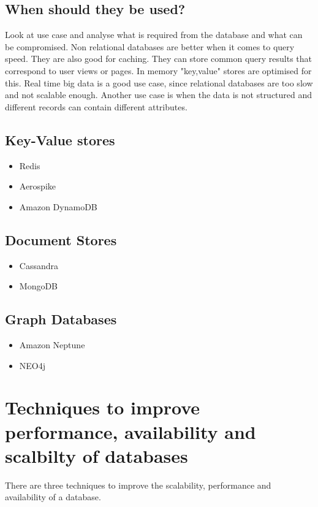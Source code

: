 \subsection{When should they be used?}
Look at use case and analyse what is required from the database and what can be compromised.
Non relational databases are better when it comes to query speed.
They are also good for caching.
They can store common query results that correspond to user views or pages.
In memory "key,value" stores are optimised for this.
Real time big data is a good use case, since relational databases are too slow and not scalable enough.
Another use case is when the data is not structured and different records can contain different attributes.

\subsection{Key-Value stores}
\begin{itemize}
    \item Redis
    \item Aerospike
    \item Amazon DynamoDB
\end{itemize}

\subsection{Document Stores}
\begin{itemize}
    \item Cassandra
    \item MongoDB
\end{itemize}

\subsection{Graph Databases}
\begin{itemize}
    \item Amazon Neptune
    \item NEO4j
\end{itemize}


\section{Techniques to improve performance, availability and scalbilty of databases}
There are three techniques to improve the scalability, performance and availability of a database.

